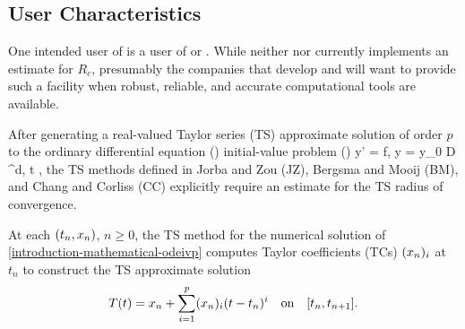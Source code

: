 \documentclass[12pt]{article}
\begin{document}


\subsection{User Characteristics} \label{SecUserCharacteristics}
\label{sc:SecUserCharacteristics}

One intended user of  is a user of \maple or \matlab. While
neither \matlab nor \maple currently implements an estimate for $R_c$,
presumably the companies that develop \matlab and \maple will want
to provide such a facility when robust, reliable, and accurate computational
tools are available.

After generating a real-valued Taylor series (TS) approximate solution of order $p$ to the
ordinary differential equation (\ode) initial-value problem (\ivp) 
\EQ
{
  \label{eq:introduction-mathematical-odeivp}
  y' = f,
  \quad
  y = y_0 \in \mathcal D \subset \Rz^d,
  \quad
  t \in \iode \subset \Rz,
}
the TS methods defined in
Jorba and Zou \cite{jorba2005software} (JZ),
Bergsma and Mooij \cite{bergsma2016application} (BM),
and
Chang and Corliss \cite{chang1982} (CC)
explicitly require an estimate for the TS radius of convergence.

At each $( {t_n,x_n} )$, $n \geq 0$, the TS method for the numerical solution
of \eqref{introduction-mathematical-odeivp} computes Taylor coefficients (TCs)
$(x_{n})_{i}$ at $t_{n}$ to construct the TS approximate solution
\begin{align}
  \label{eq:tss}
  \Tp(t) = \xn + \sum_{i=1}^{p}\tc{\xn}{i}(t-\tn)^{i} \quad\mbox{on}\quad \lode.
\end{align}
\end{document}
